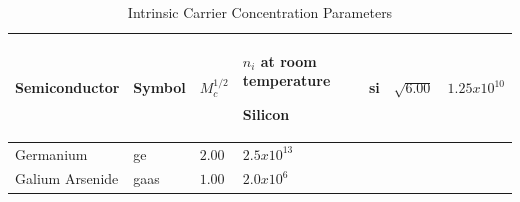 



\small

\begin{longtable}[htbp]{|
>{\setlength{\hsize}{1.0\hsize}}Y|
>{\setlength{\hsize}{0.5\hsize}}Y|
>{\setlength{\hsize}{0.5\hsize}}Y|
>{\setlength{\hsize}{0.5\hsize}}Y|} 

  \caption[Intrinsic Carrier Concentration Parameters]
    {Intrinsic Carrier Concentration Parameters \label{intrinsicTable}}
\\
\hline

\color{white} \bf Semiconductor &
\color{white} \bf Symbol &
\color{white} \bf $M_c^{1/2}$  &
\color{white} \bf $n_i$ at room temperature \endhead \hline 

   Silicon           &  si   &  $\sqrt{6.00}$ & $1.25 x 10^{10}$  \\ \hline
   Germanium         &  ge   &  $2.00$        & $2.5 x 10^{13}$  \\ \hline
   Galium Arsenide   &  gaas &  $1.00$        & $2.0 x 10^{6}$ \\ \hline

\end{longtable}


